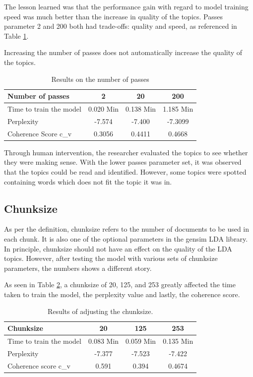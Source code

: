 The lesson learned was that the performance gain with regard to model training speed was much better than the increase in quality of the topics. Passes parameter 2 and 200 both had trade-offs: quality and speed, as referenced in Table \ref{tab:passes}.

\begin{lesson}
Increasing the number of passes does not automatically increase the quality of the topics.
\end{lesson}\label{L:quality}

\begin{table}[]
\centering
\begin{tabular}{|l|c|c|c|}
\hline
Number of passes & 2 & 20 & 200 \\ \hline
Time to train the model & 0.020 Min & 0.138 Min & 1.185 Min \\ \hline
Perplexity & -7.574 & -7.400 & -7.3099 \\ \hline
Coherence Score c\_v & 0.3056 & 0.4411 & 0.4668 \\ \hline
\end{tabular}
\caption{Results on the number of passes}
\label{tab:passes}
\end{table}

Through human intervention, the researcher evaluated the topics to see whether they were making sense. With the lower passes parameter set, it was observed that the topics could be read and identified. However, some topics were spotted containing words which does not fit the topic it was in.

\subsection{Chunksize}

As per the definition, chunksize refers to the number of documents to be used in each chunk. It is also one of the optional parameters in the gensim LDA library. In principle, chunksize should not have an effect on the quality of the LDA topics. However, after testing the model with various sets of chunksize parameters, the numbers shows a different story.

As seen in Table \ref{tab:chunksize}, a chunksize of 20, 125, and 253 greatly affected the time taken to train the model, the perplexity value and lastly, the coherence score.

\begin{table}[]
\centering
\begin{tabular}{|l|c|c|c|}
\hline
Chunksize & 20 & 125 & 253 \\ \hline
Time to train the model & 0.083 Min & 0.059 Min & 0.135 Min \\ \hline
Perplexity & -7.377 & -7.523 & -7.422 \\ \hline
Coherence score c\_v & 0.591 & 0.394 & 0.4674 \\ \hline
\end{tabular}
\caption{Results of adjusting the chunksize.}
\label{tab:chunksize}
\end{table}

